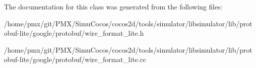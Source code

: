 The documentation for this class was generated from the following files\+:\begin{DoxyCompactItemize}
\item 
/home/pmx/git/\+P\+M\+X/\+Simu\+Cocos/cocos2d/tools/simulator/libsimulator/lib/protobuf-\/lite/google/protobuf/wire\+\_\+format\+\_\+lite.\+h\item 
/home/pmx/git/\+P\+M\+X/\+Simu\+Cocos/cocos2d/tools/simulator/libsimulator/lib/protobuf-\/lite/google/protobuf/wire\+\_\+format\+\_\+lite.\+cc\end{DoxyCompactItemize}

